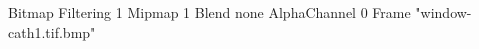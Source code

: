 {Bitmap
	{Filtering 1}
	{Mipmap 1}
	{Blend none}
	{AlphaChannel 0}
	{Frame "window-cath1.tif.bmp"}
}
